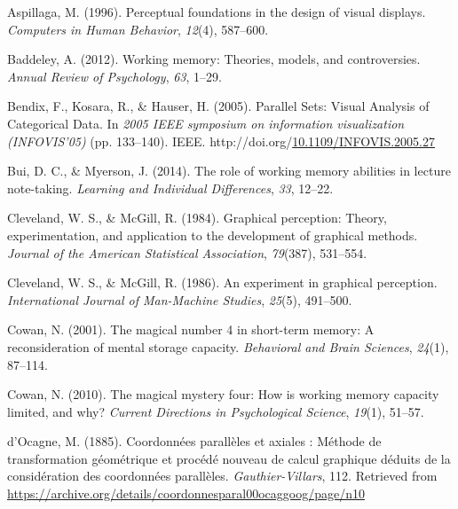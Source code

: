 \documentclass[print]{nuthesis}
\newlength{\cslhangindent}
\newenvironment{CSLReferences}[2]%
{\setlength{\parindent}{0pt}%
\everypar{\setlength{\hangindent}{\cslhangindent}}\ignorespaces}%
{\par}
\begin{document}

\hypertarget{refs}{}
\begin{CSLReferences}{1}{0}
\leavevmode{}%
Aspillaga, M. (1996). Perceptual foundations in the design of visual displays. \emph{Computers in Human Behavior}, \emph{12}(4), 587--600.

\leavevmode{}%
Baddeley, A. (2012). Working memory: Theories, models, and controversies. \emph{Annual Review of Psychology}, \emph{63}, 1--29.

\leavevmode{}%
Bendix, F., Kosara, R., \& Hauser, H. (2005). {Parallel Sets: Visual Analysis of Categorical Data}. In \emph{2005 IEEE symposium on information visualization (INFOVIS'05)} (pp. 133--140). IEEE. http://doi.org/\href{https://doi.org/10.1109/INFOVIS.2005.27}{10.1109/INFOVIS.2005.27}

\leavevmode{}%
Bui, D. C., \& Myerson, J. (2014). The role of working memory abilities in lecture note-taking. \emph{Learning and Individual Differences}, \emph{33}, 12--22.

\leavevmode{}%
Cleveland, W. S., \& McGill, R. (1984). Graphical perception: Theory, experimentation, and application to the development of graphical methods. \emph{Journal of the American Statistical Association}, \emph{79}(387), 531--554.

\leavevmode{}%
Cleveland, W. S., \& McGill, R. (1986). An experiment in graphical perception. \emph{International Journal of Man-Machine Studies}, \emph{25}(5), 491--500.

\leavevmode{}%
Cowan, N. (2001). The magical number 4 in short-term memory: A reconsideration of mental storage capacity. \emph{Behavioral and Brain Sciences}, \emph{24}(1), 87--114.

\leavevmode{}%
Cowan, N. (2010). The magical mystery four: How is working memory capacity limited, and why? \emph{Current Directions in Psychological Science}, \emph{19}(1), 51--57.

\leavevmode{}%
d'Ocagne, M. (1885). {Coordonnées parallèles et axiales : Méthode de transformation géométrique et procédé nouveau de calcul graphique déduits de la considération des coordonnées parallèles}. \emph{Gauthier-Villars}, 112. Retrieved from \url{https://archive.org/details/coordonnesparal00ocaggoog/page/n10}


\end{CSLReferences}
\end{document}
